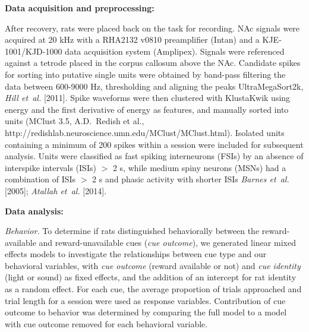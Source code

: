 \documentclass[11pt]{article}
\newcommand{\ldiffentity}[1]{#1}
\begin{document}
{\bf Data acquisition and preprocessing:}

After recovery, rats were placed back on the task for recording. NAc
signals were acquired at 20 kHz with a RHA2132 v0810 preamplifier
(Intan) and a KJE-1001/KJD-1000 data acquisition system
(Amplipex). Signals were referenced against a tetrode placed in the
corpus callosum above the NAc. Candidate spikes for sorting into
putative single units were obtained by band-pass filtering the data
between 600-9000 Hz, thresholding and aligning the peaks UltraMegaSort2k,  \ldiffentity{\textit{Hill et~al.} [\ldiffentity{2011}]}. Spike waveforms were then
clustered with KlustaKwik using energy and the first derivative of
energy as features, and manually sorted into units (MClust 3.5,
A.D.\ Redish et al., http://redishlab.neuroscience.umn.edu/MClust/MClust.html). Isolated units containing a minimum of 200
spikes within a session were included for subsequent analysis. Units
were classified as fast spiking interneurons (FSIs) by an absence of
interspike intervals (ISIs) $>$ 2 s, while medium spiny neurons (MSNs)
had a combination of ISIs $>$ 2 s and phasic activity with shorter
ISIs \ldiffentity{\textit{Barnes et~al.} [\ldiffentity{2005}]}; \ldiffentity{\textit{Atallah et~al.} [\ldiffentity{2014}]}.

{\bf Data analysis:}

{\it Behavior.} To determine if rats distinguished behaviorally
between the reward-available and reward-unavailable cues ({\it cue
outcome}), we generated linear mixed effects models to investigate
the relationships between cue type and our behavioral variables, with
{\it cue outcome} (reward available or not) and {\it cue identity}
(light or sound) as fixed effects, and the addition of an intercept
for rat identity as a random effect. For each cue, the average
proportion of trials approached and trial length for a session were
used as response variables. Contribution of cue outcome to behavior
was determined by comparing the full model to a model with cue outcome
removed for each behavioral variable.
\end{document}
